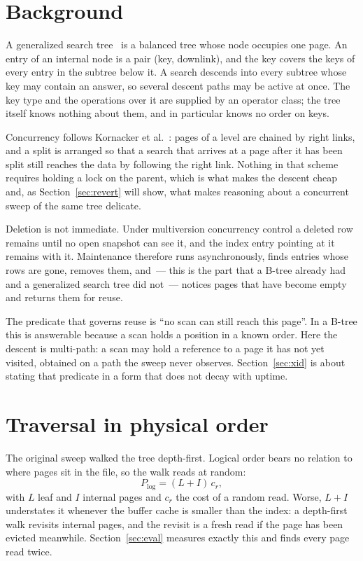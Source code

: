 \section{Background}
\label{sec:background}

A generalized search tree~\cite{hellerstein1995generalized} is a balanced tree
whose node occupies one page. An entry of an internal node is a pair (key,
downlink), and the key covers the keys of every entry in the subtree below it.
A search descends into every subtree whose key may contain an answer, so several
descent paths may be active at once. The key type and the operations over it are
supplied by an operator class; the tree itself knows nothing about them, and in
particular knows no order on keys.

Concurrency follows Kornacker et al.~\cite{kornacker1997concurrency}: pages of a
level are chained by right links, and a split is arranged so that a search that
arrives at a page after it has been split still reaches the data by following
the right link. Nothing in that scheme requires holding a lock on the parent,
which is what makes the descent cheap and, as Section~\ref{sec:revert} will
show, what makes reasoning about a concurrent sweep of the same tree delicate.

Deletion is not immediate. Under multiversion concurrency control a deleted row
remains until no open snapshot can see it, and the index entry pointing at it
remains with it. Maintenance therefore runs asynchronously, finds entries whose
rows are gone, removes them, and~--- this is the part that a B-tree already had
and a generalized search tree did not~--- notices pages that have become empty
and returns them for reuse.

The predicate that governs reuse is ``no scan can still reach this page''.
In a B-tree this is answerable because a scan holds a position in a known order.
Here the descent is multi-path: a scan may hold a reference to a page it has not
yet visited, obtained on a path the sweep never observes. Section~\ref{sec:xid}
is about stating that predicate in a form that does not decay with uptime.

\section{Traversal in physical order}
\label{sec:physical}

The original sweep walked the tree depth-first. Logical order bears no relation
to where pages sit in the file, so the walk reads at random:
%
\begin{equation}\label{eq:vac-logical}
  P_{\mathrm{log}} = (L + I)\,c_r ,
\end{equation}
%
with $L$ leaf and $I$ internal pages and $c_r$ the cost of a random read. Worse,
$L+I$ understates it whenever the buffer cache is smaller than the index: a
depth-first walk revisits internal pages, and the revisit is a fresh read if the
page has been evicted meanwhile. Section~\ref{sec:eval} measures exactly this
and finds every page read twice.

